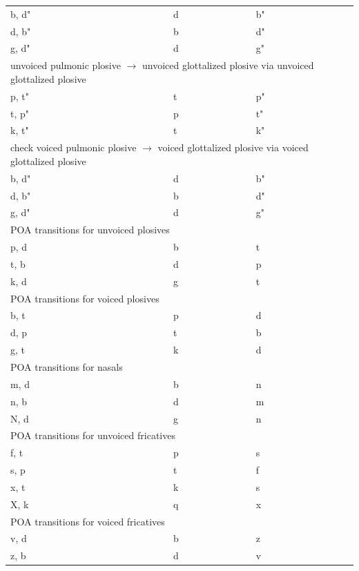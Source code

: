 \documentclass[11pt]{article}
\begin{document}
\begin{table}[h]
\begin{tabular}{ l | l | l }
b, d" & d & b" \\
d, b" & b & d" \\
g, d" & d & g" \\

\hline \multicolumn{3}{l}{unvoiced pulmonic plosive  $\rightarrow$ unvoiced glottalized plosive via unvoiced glottalized plosive  }\\  \hline

p, t" & t & p" \\
t, p" & p & t" \\
k, t" & t & k" \\

\hline \multicolumn{3}{l}{check voiced pulmonic plosive  $\rightarrow$ voiced glottalized plosive via voiced glottalized plosive}\\  \hline

b, d" & d & b" \\
d, b" & b & d" \\
g, d" & d & g" \\

\hline \multicolumn{3}{l}{POA transitions for unvoiced plosives}\\  \hline
p, d & b & t \\
t, b & d & p \\
k, d & g & t \\

\hline \multicolumn{3}{l}{POA transitions for voiced plosives}\\  \hline

b, t & p & d \\
d, p & t & b \\
g, t & k & d \\

\hline \multicolumn{3}{l}{POA transitions for  nasals}\\  \hline

m, d & b & n \\
n, b & d & m \\
N, d & g & n \\

\hline \multicolumn{3}{l}{POA transitions for unvoiced fricatives}\\  \hline

f, t & p & s \\
s, p & t & f \\
x, t & k & s \\
X, k & q & x \\

\hline \multicolumn{3}{l}{POA transitions for voiced fricatives}\\  \hline

v, d & b & z \\
z, b & d & v \\
\end{tabular}
\end{table}
\end{document}
